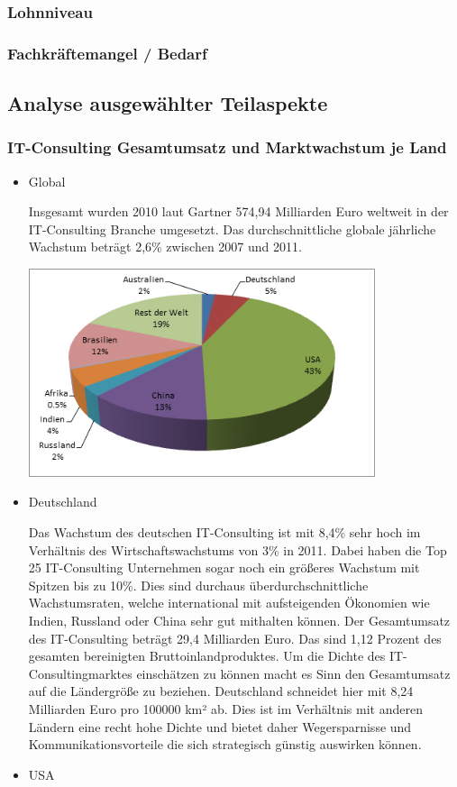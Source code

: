 \subsubsection{Lohnniveau}
\subsubsection{Fachkräftemangel / Bedarf}
\subsection{Analyse ausgewählter Teilaspekte}
\subsubsection{IT-Consulting Gesamtumsatz und Marktwachstum je Land}
\begin{itemize} 
\item {Global}

Insgesamt wurden 2010 laut Gartner 574,94 Milliarden Euro weltweit in der IT-Consulting Branche umgesetzt. \cite{itConsultingGlobal} Das durchschnittliche globale jährliche Wachstum beträgt 2,6\% zwischen 2007 und 2011.\cite{globalGartner}

\includegraphics[width=0.8\textwidth]{images/global_revenue_share.jpg} 
 \newline
\item {Deutschland}

Das Wachstum des deutschen IT-Consulting ist mit 8,4\% sehr hoch im Verhältnis des Wirtschaftswachstums von 3\% in 2011.\cite{statGer2} Dabei haben die Top 25 IT-Consulting Unternehmen sogar noch ein größeres Wachstum mit Spitzen bis zu 10\%. \cite[6]{topITB} Dies sind durchaus überdurchschnittliche Wachstumsraten, welche international mit aufsteigenden Ökonomien wie Indien, Russland oder China sehr gut mithalten können. Der Gesamtumsatz des IT-Consulting beträgt 29,4 Milliarden Euro.  Das sind 1,12 Prozent des gesamten bereinigten Bruttoinlandproduktes. \cite{statGer} Um die Dichte des IT-Consultingmarktes einschätzen zu können macht es Sinn den Gesamtumsatz auf die Ländergröße zu beziehen. 
Deutschland schneidet hier mit 8,24 Milliarden Euro pro 100000 km² ab. Dies ist im Verhältnis mit anderen Ländern eine recht hohe Dichte und bietet daher Wegersparnisse und Kommunikationsvorteile die sich strategisch günstig auswirken können.
 \newline
\item {USA}


\end{itemize}
